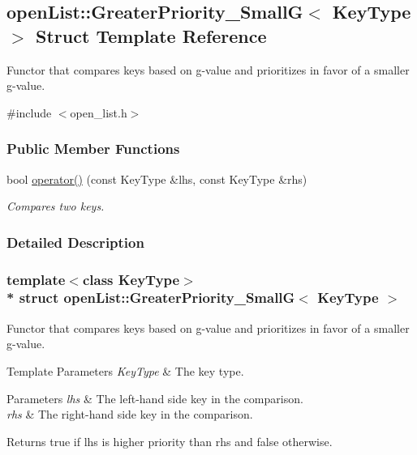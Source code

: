 \hypertarget{structopenList_1_1GreaterPriority__SmallG}{}\subsection{open\+List\+:\+:Greater\+Priority\+\_\+\+SmallG$<$ Key\+Type $>$ Struct Template Reference}
\label{structopenList_1_1GreaterPriority__SmallG}


Functor that compares keys based on g-\/value and prioritizes in favor of a smaller g-\/value.  




{\ttfamily \#include $<$open\+\_\+list.\+h$>$}

\subsubsection*{Public Member Functions}
\begin{DoxyCompactItemize}
\item 
bool \hyperlink{structopenList_1_1GreaterPriority__SmallG_a157b1208eade077c1b4729811d29b760}{operator()} (const Key\+Type \&lhs, const Key\+Type \&rhs)
\begin{DoxyCompactList}\small\item\em Compares two keys. \end{DoxyCompactList}\end{DoxyCompactItemize}


\subsubsection{Detailed Description}
\subsubsection*{template$<$class Key\+Type$>$\\*
struct open\+List\+::\+Greater\+Priority\+\_\+\+Small\+G$<$ Key\+Type $>$}

Functor that compares keys based on g-\/value and prioritizes in favor of a smaller g-\/value. 


\begin{DoxyTemplParams}{Template Parameters}
{\em Key\+Type} & The key type. \\
\hline
\end{DoxyTemplParams}

\begin{DoxyParams}{Parameters}
{\em lhs} & The left-\/hand side key in the comparison. \\
\hline
{\em rhs} & The right-\/hand side key in the comparison. \\
\hline
\end{DoxyParams}
\begin{DoxyReturn}{Returns}
{\ttfamily true} if {\ttfamily lhs} is higher priority than {\ttfamily rhs} and {\ttfamily false} otherwise. 
\end{DoxyReturn}


